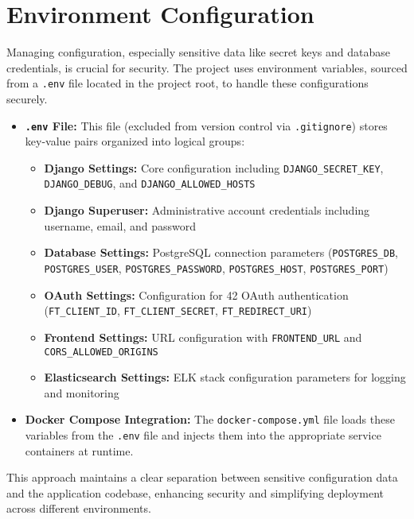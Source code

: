 \section{Environment Configuration}
\label{sec:env_config}
Managing configuration, especially sensitive data like secret keys and database credentials, is crucial for security. The project uses environment variables, sourced from a \texttt{.env} file located in the project root, to handle these configurations securely.
\begin{itemize}
    \item \textbf{\texttt{.env} File:} This file (excluded from version control via \texttt{.gitignore}) stores key-value pairs organized into logical groups:
    \begin{itemize}
        \item \textbf{Django Settings:} Core configuration including \texttt{DJANGO\_SECRET\_KEY}, \texttt{DJANGO\_DEBUG}, and \texttt{DJANGO\_ALLOWED\_HOSTS}
        \item \textbf{Django Superuser:} Administrative account credentials including username, email, and password
        \item \textbf{Database Settings:} PostgreSQL connection parameters (\texttt{POSTGRES\_DB}, \texttt{POSTGRES\_USER}, \texttt{POSTGRES\_PASSWORD}, \texttt{POSTGRES\_HOST}, \texttt{POSTGRES\_PORT})
        \item \textbf{OAuth Settings:} Configuration for 42 OAuth authentication (\texttt{FT\_CLIENT\_ID}, \texttt{FT\_CLIENT\_SECRET}, \texttt{FT\_REDIRECT\_URI})
        \item \textbf{Frontend Settings:} URL configuration with \texttt{FRONTEND\_URL} and \texttt{CORS\_ALLOWED\_ORIGINS}
        \item \textbf{Elasticsearch Settings:} ELK stack configuration parameters for logging and monitoring
    \end{itemize}
    \item \textbf{Docker Compose Integration:} The \texttt{docker-compose.yml} file loads these variables from the \texttt{.env} file and injects them into the appropriate service containers at runtime.
\end{itemize}
This approach maintains a clear separation between sensitive configuration data and the application codebase, enhancing security and simplifying deployment across different environments.

